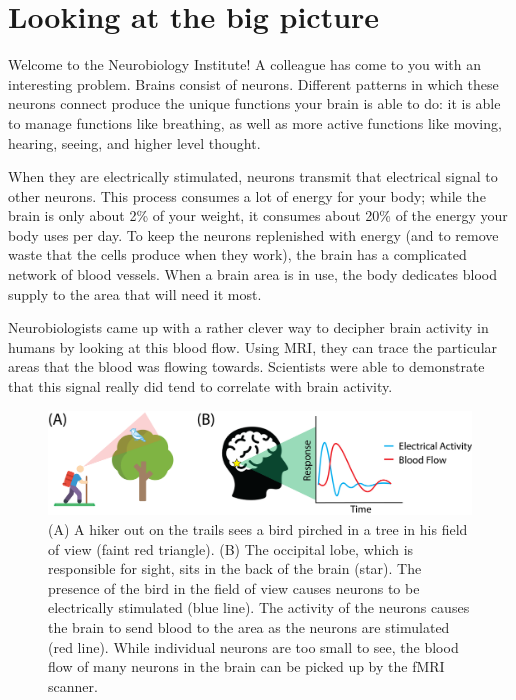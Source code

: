\section{Looking at the big picture}
\label{sec:ch2:bigpicture}


Welcome to the Neurobiology Institute! A colleague has come to you with an interesting problem. Brains consist of neurons. Different patterns in which these neurons connect produce the unique functions your brain is able to do: it is able to manage functions like breathing, as well as more active functions like moving, hearing, seeing, and higher level thought.

When they are electrically stimulated, neurons transmit that electrical signal to other neurons. This process consumes a lot of energy for your body; while the brain is only about 2\% of your weight, it consumes about 20\% of the energy your body uses per day. To keep the neurons replenished with energy (and to remove waste that the cells produce when they work), the brain has a complicated network of blood vessels. When a brain area is in use, the body dedicates blood supply to the area that will need it most.

Neurobiologists came up with a rather clever way to decipher brain activity in humans by looking at this blood flow. Using MRI, they can trace the particular areas that the blood was flowing towards. Scientists were able to demonstrate that this signal really did tend to correlate with brain activity. 

\begin{figure}[h]
    \centering
    \includegraphics[width=\linewidth]{foundations/ch2/Images/fmri_bold.png}
    \caption[BOLD f-MRI]{(A) A hiker out on the trails sees a bird pirched in a tree in his field of view (faint red triangle). (B) The occipital lobe, which is responsible for sight, sits in the back of the brain (star). The presence of the bird in the field of view causes neurons to be electrically stimulated (blue line). The activity of the neurons causes the brain to send blood to the area as the neurons are stimulated (red line). While individual neurons are too small to see, the blood flow of many neurons in the brain can be picked up by the fMRI scanner.}
    \label{fig:fmri-bold}
\end{figure}

